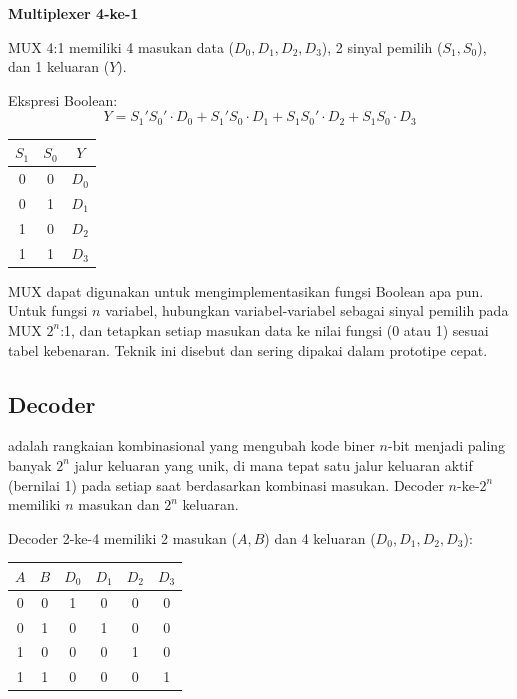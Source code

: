 \begin{contoh}
\textbf{Multiplexer 4-ke-1}

MUX 4:1 memiliki 4 masukan data ($D_0, D_1, D_2, D_3$), 2 sinyal pemilih ($S_1, S_0$), dan 1 keluaran ($Y$).

Ekspresi Boolean:
\[ Y = S_1'S_0' \cdot D_0 + S_1'S_0 \cdot D_1 + S_1 S_0' \cdot D_2 + S_1 S_0 \cdot D_3 \]

\begin{center}
\renewcommand{\arraystretch}{1.2}
\begin{tabular}{|c|c||c|}
\hline
$S_1$ & $S_0$ & $Y$ \\ \hline
0 & 0 & $D_0$ \\ \hline
0 & 1 & $D_1$ \\ \hline
1 & 0 & $D_2$ \\ \hline
1 & 1 & $D_3$ \\ \hline
\end{tabular}
\end{center}
\end{contoh}

\begin{konsep}
MUX dapat digunakan untuk mengimplementasikan fungsi Boolean apa pun. Untuk fungsi $n$ variabel, hubungkan variabel-variabel sebagai sinyal pemilih pada MUX $2^n$:1, dan tetapkan setiap masukan data ke nilai fungsi (0 atau 1) sesuai tabel kebenaran. Teknik ini disebut  dan sering dipakai dalam prototipe cepat.
\end{konsep}

\subsection{Decoder}

\begin{definisi}[Decoder]
 adalah rangkaian kombinasional yang mengubah kode biner $n$-bit menjadi paling banyak $2^n$ jalur keluaran yang unik, di mana tepat satu jalur keluaran aktif (bernilai 1) pada setiap saat berdasarkan kombinasi masukan. Decoder $n$-ke-$2^n$ memiliki $n$ masukan dan $2^n$ keluaran.
\end{definisi}

Decoder 2-ke-4 memiliki 2 masukan ($A, B$) dan 4 keluaran ($D_0, D_1, D_2, D_3$):

\begin{center}
\renewcommand{\arraystretch}{1.2}
\begin{tabular}{|c|c||c|c|c|c|}
\hline
$A$ & $B$ & $D_0$ & $D_1$ & $D_2$ & $D_3$ \\ \hline
0 & 0 & 1 & 0 & 0 & 0 \\ \hline
0 & 1 & 0 & 1 & 0 & 0 \\ \hline
1 & 0 & 0 & 0 & 1 & 0 \\ \hline
1 & 1 & 0 & 0 & 0 & 1 \\ \hline
\end{tabular}
\end{center}

